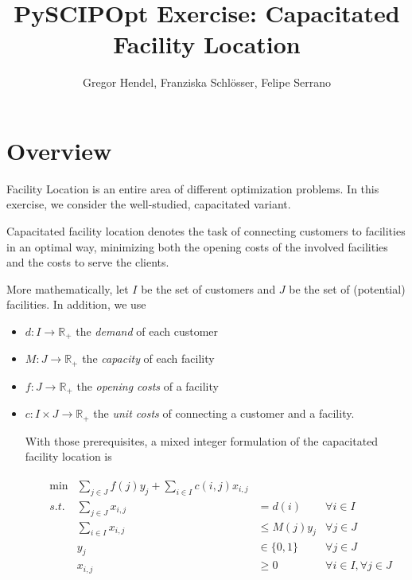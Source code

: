\documentclass[a4paper,10pt]{article}
\title{PySCIPOpt Exercise: Capacitated Facility Location}
\author{Gregor Hendel, Franziska Schlösser, Felipe Serrano}
\begin{document}
\maketitle




\section{Overview}

Facility Location is an entire area of different optimization problems. In this exercise, we
consider the well-studied, capacitated variant.

Capacitated facility location denotes the task
of connecting customers to facilities in an optimal way,
minimizing both the opening costs of
the involved facilities and the costs to serve
the clients.

More mathematically, let $I$ be the set of customers
and $J$ be the set of (potential) facilities. In addition, we use

\begin{itemize}
 \item $d : I \rightarrow \mathbb{R}_{+}$ the \emph{demand} of each customer
 \item $M : J \rightarrow \mathbb{R}_{+}$ the \emph{capacity} of each facility
 \item $f : J \rightarrow \mathbb{R}_{+}$ the \emph{opening costs} of a facility
 \item $c : I \times J \rightarrow \mathbb{R}_{+}$
    the \emph{unit costs} of connecting
    a customer and a facility.

With those prerequisites, a mixed integer formulation
of the capacitated facility location
is

\begin{align}
 \begin{aligned}
  &\min &\sum\limits_{j \in J} f(j) y_{j} + \sum\limits_{i \in I} c(i,j) x_{i,j}\\
  & s.t. & \sum\limits_{j \in J} x_{i,j} &= d(i) & \forall i \in I\\
  && \sum\limits_{i \in I} x_{i,j} &\leq M(j)y_{j} & \forall j \in J\\
  && y_{j} &\in \{0,1\} & \forall j \in J\\
  && x_{i,j} &\geq 0 &\forall i \in I,\forall j \in J
 \end{aligned}
\end{align}


\end{itemize}
\end{document}
